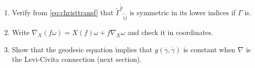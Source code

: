\begin{exercises}
\begin{enumerate}[nosep]
\item Verify from \eqref{eq:christtransf} that $\tilde\Gamma^{\tilde k}{}_{\tilde i\tilde j}$ is symmetric in its lower indices if $\Gamma$ is.
\item Write $\nabla_X(f\omega)=X(f)\omega+f\nabla_X\omega$ and check it in coordinates.
\item Show that the geodesic equation implies that $g(\dot\gamma,\dot\gamma)$ is constant when $\nabla$ is the Levi-Civita connection (next section).
\end{enumerate}
\end{exercises}
